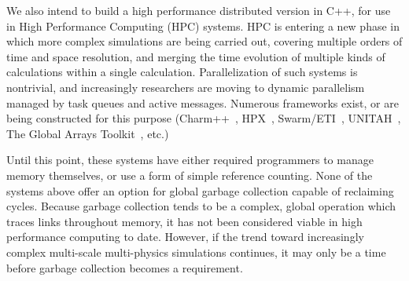 We also intend to build a high performance distributed version in C++, for
use in High Performance Computing (HPC) systems.
HPC is entering a new phase  in which more complex
simulations are being carried out, covering multiple orders of time and space resolution, and
merging the time evolution of multiple kinds of calculations within a single
calculation. Parallelization of such systems is nontrivial, and increasingly
researchers are moving to dynamic parallelism managed by task queues and
active messages. Numerous frameworks exist,
or are being constructed for this purpose (Charm++~\cite{kale1993charm++},
HPX~\cite{kaiser2009parallex}, Swarm/ETI~\cite{lauderdale2012towards},
UNITAH~\cite{berzins2010uintah}, The Global Arrays
Toolkit~\cite{nieplocha1994global}, etc.)

Until this point, these systems have either required programmers to manage
memory themselves, or use a form of simple reference counting. None of the systems
above offer
an option for global garbage collection capable of reclaiming cycles. Because
garbage collection tends to be a complex, global operation which traces links
throughout memory, it has not been
considered viable in high performance computing to date. However, if the trend
toward increasingly complex multi-scale multi-physics simulations continues, it
may only be a time before garbage collection becomes a requirement.





